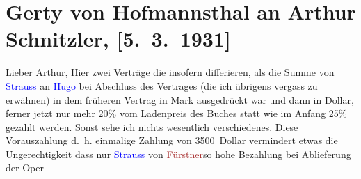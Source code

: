 

               \section[Gerty von Hofmannsthal an Arthur Schnitzler, {[}5. 3. 1931{]}]{ Gerty von Hofmannsthal an Arthur Schnitzler, {[}5. 3. 1931{]}}\nopagebreak{}\rehead{ }\normalsize\beginnumbering{} \toendnotes[C]{\smallbreak\pagebreak[2]} 
\toendnotes[C]{\smallbreak}\pstart
           \raggedleft{}{\pb}\label{K_L02544_1v}\label{K_L02544_1h}\pend
           \pstart{}Lieber Arthur,\pend\pstart
           Hier zwei Verträge die insofern differieren, als
                    die Summe von \textcolor{blue}{Strauss}{}\ledrightnote{\textcolor{blue}{Richard Strauss}} an \textcolor{blue}{Hugo}{}\ledrightnote{\textcolor{blue}{Hugo von Hofmannsthal}} bei Abschluss des Vertrages (die ich übrigens vergass zu erwähnen) in dem früheren
                    Vertrag in Mark ausgedrückt war und dann in Dollar, ferner jetzt nur mehr 20{\%} vom Ladenpreis des Buches statt wie im Anfang 25{\%} gezahlt werden. Sonst sehe ich nichts wesentlich
                    verschiedenes. Diese Vorauszahlung d. h. einmalige Zahlung von 3500 Dollar
                    vermindert etwas die Ungerechtigkeit dass nur \textcolor{blue}{Strauss}{}\ledrightnote{\textcolor{blue}{Richard Strauss}} von \textcolor{brown}{Fürstner}{}\ledrightnote{\textcolor{brown}{Musikverlag Adolph Fürstner}}{ }so hohe Bezahlung bei Ablieferung der Oper

